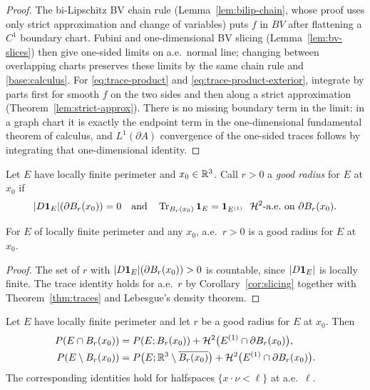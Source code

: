 \begin{proof}
The bi-Lipschitz BV chain rule (Lemma~\ref{lem:bilip-chain}, whose proof uses
only strict approximation and change of variables) puts $f$ in $BV$ after
flattening a $C^1$ boundary chart.  Fubini and one-dimensional BV slicing
(Lemma~\ref{lem:bv-slices}) then give one-sided limits on a.e.\ normal line;
changing between overlapping charts preserves these limits by the same chain
rule and \ref{base:calculus}.
For \eqref{eq:trace-product} and \eqref{eq:trace-product-exterior}, integrate
by parts first for smooth $f$ on the two sides and then along a strict
approximation (Theorem~\ref{lem:strict-approx}).  There is no missing boundary
term in the limit: in a graph chart it is exactly the endpoint term in the
one-dimensional fundamental theorem of calculus, and
$L^1(\partial A)$ convergence of the one-sided traces follows by integrating
that one-dimensional identity.
\end{proof}

\begin{definition}\label{def:good-radius}
Let $E$ have locally finite perimeter and $x_0\in\mathbb R^3$.  Call $r>0$ a
\emph{good radius} for $E$ at $x_0$ if
\[
  |D\mathbf 1_{E}|(\partial B_r(x_0))=0
  \quad\text{and}\quad
  \operatorname{Tr}_{B_r(x_0)}\mathbf 1_{E}=\mathbf 1_{E^{(1)}}\ \ \mathcal H^2\text{-a.e.\ on }\partial B_r(x_0).
\]
\end{definition}

\begin{lemma}\label{lem:good-radius-ae}
For $E$ of locally finite perimeter and any $x_0$, a.e.\ $r>0$ is a good
radius for $E$ at $x_0$.
\end{lemma}

\begin{proof}
The set of $r$ with $|D\mathbf 1_{E}|(\partial B_r(x_0))>0$ is countable, since
$|D\mathbf 1_{E}|$ is locally finite.  The trace identity holds for a.e.\ $r$ by
Corollary~\ref{cor:slicing} together with Theorem~\ref{thm:traces} and
Lebesgue's density theorem.
\end{proof}

\begin{proposition}\label{prop:cut-identities}
Let $E$ have locally finite perimeter and let $r$ be a good radius for $E$ at
$x_0$.  Then
\begin{align}
  P(E\cap B_r(x_0))
    &=P(E;B_r(x_0))+\mathcal H^2\bigl(E^{(1)}\cap\partial B_r(x_0)\bigr),
      \label{eq:cut-in}\\
  P(E\setminus B_r(x_0))
    &=P\bigl(E;\mathbb R^3\setminus\overline{B_r(x_0)}\bigr)
      +\mathcal H^2\bigl(E^{(1)}\cap\partial B_r(x_0)\bigr).
      \label{eq:cut-out}
\end{align}
The corresponding identities hold for halfspaces $\{x\cdot\nu<\ell\}$ at
a.e.\ $\ell$.
\end{proposition}

